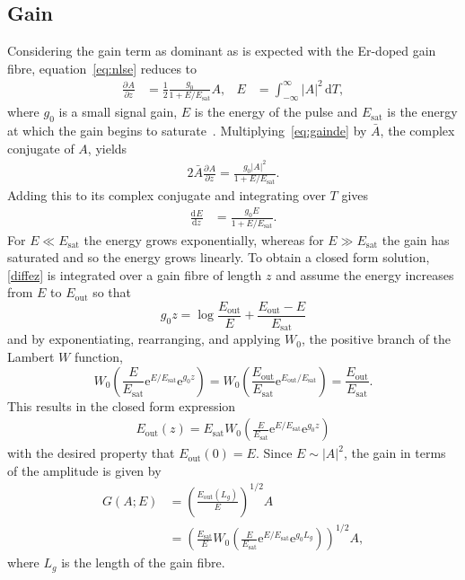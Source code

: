 \documentclass[%
 aps,
 jmp,%
 amsmath,amssymb,
 reprint,%
nofootinbib
]{revtex4-1}
\providecommand{\df}{\textrm{d}}
\newcommand{\diff}[3][]{\frac{\textrm{d}^{#1}#2}{\textrm{d}{#3}^{#1}}}
\newcommand{\pdiff}[3][]{\frac{\partial^{#1}#2}{\partial{#3}^{#1}}}
\newcommand{\Es}{E_{\textrm{sat}}}
\begin{document}
\subsection{Gain}
Considering the gain term as dominant as is expected with the Er-doped gain fibre, equation~\eqref{eq:nlse} reduces to
\begin{align}
\label{eq:gainde}
	\pdiff{A}{z} &= \frac{1}{2} \frac{g_0}{1 + E / \Es} A,& E &= \int_{-\infty}^\infty |A|^2 \, \df T,
\end{align}
where $g_0$ is a small signal gain, $E$ is the energy of the pulse and $\Es$ is the energy at which the gain begins to saturate~\cite{bohun, burgoyne2014, shtyrina, silfvast, yarutkina}.
Multiplying~\eqref{eq:gainde} by $\bar{A}$, the complex conjugate of $A$, yields
\begin{align*}
	2\bar{A} \pdiff{A}{z} = \frac{g_0 |A|^2}{1 + E / \Es}.
\end{align*}
Adding this to its complex conjugate and integrating over $T$ gives
\begin{align}
\label{diffez}
	\diff{E}{z} &= \frac{g_0 E}{1 + E / \Es}.
\end{align}
For $E \ll \Es$ the energy grows exponentially, whereas for $E \gg \Es$ the gain has saturated and so the energy grows linearly. To obtain a closed form solution, \eqref{diffez} is integrated over a gain fibre of length $z$ and assume the energy increases from $E$ to $E_{\textrm{out}}$ so that
\[
	g_0 z = \log\frac{E_{\textrm{out}}}{E} + \frac{E_{\textrm{out}}-E}{\Es}
\]
and by exponentiating, rearranging, and applying $W_0$, the positive branch of the Lambert $W$ function,
\[
	 W_0\left(\frac{E}{\Es} \textrm{e}^{E/\Es} \textrm{e}^{g_0 z}\right) = 
	 W_0\left(\frac{E_{\textrm{out}}}{\Es} \textrm{e}^{E_{\textrm{out}}/\Es}\right) = \frac{E_{\textrm{out}}}{\Es}.
\]
This results in the closed form expression
\begin{align}
\label{eq:energy}
	E_{\textrm{out}}(z) = \Es W_0 \left( \frac{E}{\Es} \textrm{e}^{E/\Es} \textrm{e}^{g_0 z} \right)
\end{align}
with the desired property that $E_{\textrm{out}}(0)=E$. Since $E \sim |A|^2$, the gain in terms of the amplitude is given by
\begin{align}
	\nonumber G(A;E) &= \left(\frac{E_{\textrm{out}}(L_g)}{E}\right)^{1/2}A \\
	\label{eq:gain}
	&= \left( \frac{\Es}{E} W_0 \left( \frac{E}{\Es} \textrm{e}^{E/\Es} 
	\textrm{e}^{g_0 L_g} \right) \right)^{1/2} A,
\end{align}
where $L_g$ is the length of the gain fibre.
\end{document}
